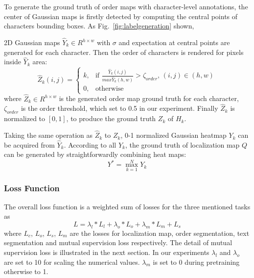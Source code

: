 \documentclass[letterpaper]{article} \usepackage{aaai20}  \usepackage{times}  \usepackage{helvet} \usepackage{courier}  \usepackage[hyphens]{url}  \usepackage{graphicx} \urlstyle{rm} \def\UrlFont{\rm}  \usepackage{graphicx}  \frenchspacing  \setlength{\pdfpagewidth}{8.5in}  \setlength{\pdfpageheight}{11in}
\begin{document}
To generate the ground truth of order maps with character-level annotations, the center of Gaussian maps is firstly detected by computing the central points of characters bounding boxes. As Fig.~\ref{fig:labelgeneration} shown, 

2D Gaussian maps $\hat{Y}_{k} \in R^{h \times w}$ with $\sigma$ and expectation at central points are generated for each character. Then the order of characters is rendered for pixels inside $\hat{Y}_{k}$ area:
\begin{equation}
    \hat{Z}_{k}(i,j) = 
    \begin{cases}
    k, & \textrm{if $\frac{\hat{Y}_{k}(i,j)}{max\hat{Y}_k(h,w)} > \zeta_{order}$, $(i,j) \in (h,w)$} \\
    0, & \text{otherwise}
    \end{cases}
\end{equation}
where $\hat{Z}_{k} \in R^{h \times w}$ is the generated order map ground truth for each character, $\zeta_{order}$ is the order threshold, which set to 0.5 in our experiment. 
Finally $\hat{Z}_{k}$ is normalized to $[0, 1]$, to produce the ground truth $Z_{k}$ of $H_{k}$.

Taking the same operation as $\hat{Z}_{k}$ to ${Z}_{k}$, 0-1 normalized Gaussian heatmap ${Y}_{k}$ can be acquired from $\hat{Y}_{k}$. According to all ${Y}_{k}$, the ground truth of localization map $Q$ can be generated by straightforwardly combining heat maps:
\begin{equation}
    Y^{*} = \max_{k=1}^{N}{Y_{k}}
\end{equation}


\subsubsection{Loss Function}

The overall loss function 
is a weighted sum of losses for the three mentioned tasks as
\begin{equation}
    L = \lambda_{l} * L_{l} + \lambda_{o} * L_{o} + \lambda_{m} * L_{m} + L_{s}
\end{equation}
where $L_{c}$, $L_{o}$, $L_{s}$, $L_{m}$ are the losses for localization map, order segmentation, text segmentation and mutual supervision loss respectively. The detail of mutual supervision loss is illustrated in the next section. In our experiments $\lambda_{l}$ and $\lambda_{o}$ are set to 10 for scaling the numerical values. $\lambda_{m}$ is set to 0 during pretraining otherwise to 1.
\end{document}
